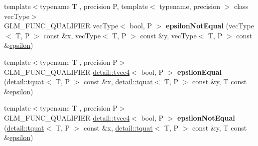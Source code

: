 \begin{DoxyCompactItemize}
\item 
{\footnotesize template$<$typename T , precision P, template$<$ typename, precision $>$ class vec\+Type$>$ }\\G\+L\+M\+\_\+\+F\+U\+N\+C\+\_\+\+Q\+U\+A\+L\+I\+F\+I\+ER vec\+Type$<$ bool, P $>$ {\bfseries epsilon\+Not\+Equal} (vec\+Type$<$ T, P $>$ const \&x, vec\+Type$<$ T, P $>$ const \&y, vec\+Type$<$ T, P $>$ const \&\hyperlink{group__gtc__constants_gacb41049b8d22c8aa90e362b96c524feb}{epsilon})\hypertarget{namespaceglm_a34387d61360bf88bcca96b797f53e49d}{}\label{namespaceglm_a34387d61360bf88bcca96b797f53e49d}

\item 
{\footnotesize template$<$typename T , precision P$>$ }\\G\+L\+M\+\_\+\+F\+U\+N\+C\+\_\+\+Q\+U\+A\+L\+I\+F\+I\+ER \hyperlink{structglm_1_1detail_1_1tvec4}{detail\+::tvec4}$<$ bool, P $>$ {\bfseries epsilon\+Equal} (\hyperlink{structglm_1_1detail_1_1tquat}{detail\+::tquat}$<$ T, P $>$ const \&x, \hyperlink{structglm_1_1detail_1_1tquat}{detail\+::tquat}$<$ T, P $>$ const \&y, T const \&\hyperlink{group__gtc__constants_gacb41049b8d22c8aa90e362b96c524feb}{epsilon})\hypertarget{namespaceglm_a4c75af68224e0fea510364c0ef246a46}{}\label{namespaceglm_a4c75af68224e0fea510364c0ef246a46}

\item 
{\footnotesize template$<$typename T , precision P$>$ }\\G\+L\+M\+\_\+\+F\+U\+N\+C\+\_\+\+Q\+U\+A\+L\+I\+F\+I\+ER \hyperlink{structglm_1_1detail_1_1tvec4}{detail\+::tvec4}$<$ bool, P $>$ {\bfseries epsilon\+Not\+Equal} (\hyperlink{structglm_1_1detail_1_1tquat}{detail\+::tquat}$<$ T, P $>$ const \&x, \hyperlink{structglm_1_1detail_1_1tquat}{detail\+::tquat}$<$ T, P $>$ const \&y, T const \&\hyperlink{group__gtc__constants_gacb41049b8d22c8aa90e362b96c524feb}{epsilon})\hypertarget{namespaceglm_a7f1b10921333eeda77cd5c1f4a4b2101}{}\label{namespaceglm_a7f1b10921333eeda77cd5c1f4a4b2101}


\end{DoxyCompactItemize}

